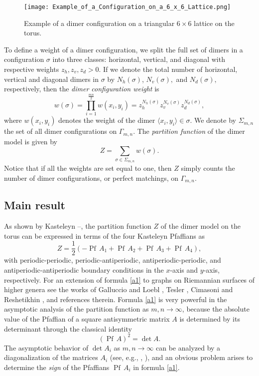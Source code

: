 \documentclass[12pt,reqno]{amsart}
\numberwithin{equation}{section}
\newcommand{\Ga}{\Gamma}
\newcommand{\sg}{\sigma}
\newcommand{\Pf}{{\operatorname{Pf}\,}}
\begin{document}
\begin{figure}[h!]
\texttt{[image: Example\_of\_a\_Configuration\_on\_a\_6\_x\_6\_Lattice.png]}
\caption{Example of a dimer configuration on a triangular $6\times 6$ lattice on the torus.}
\label{F8}
\end{figure}

To define a weight of a dimer configuration, we split the full set of dimers in a configuration $\sg$ into three classes: horizontal, vertical, and diagonal with respective weights $z_h, z_v, z_d>0.$ 
If we denote the total number of horizontal, vertical and diagonal dimers in $\sg$ by $N_h(\sg)$, $N_v(\sg),$ and $N_d(\sg),$ respectively, then the \textit{dimer configuration weight} is
\begin{equation}\label{int1}
w(\sg)=\prod_{i=1}^{\frac{mn}{2}}w(x_i,y_i)=z_h^{N_h(\sg)} z_v^{N_v(\sg)}z_d^{N_d(\sg)},
\end{equation}
where $w(x_i,y_i)$ denotes the weight of the dimer $\langle x_i,y_i\rangle\in\sg$.
We denote by $\Sigma_{m,n}$ the set of all dimer configurations on $\Ga_{m,n}$. 
The \textit{partition function} of the dimer model is given by
\begin{equation}\label{int2}
Z=\sum_{\sg\in\Sigma_{m,n}}w(\sg).
\end{equation}
Notice that if all the weights are set equal to one, then $Z$ simply counts the number of dimer configurations, or perfect matchings, on $\Gamma_{m,n}$. 

\subsection{Main result} As shown by Kasteleyn \cite{Kas1}--\cite{Kas3}, the partition function $Z$ of the dimer model on the torus can be expressed in terms of the
 four Kasteleyn Pfaffians as
\begin{equation}\label{a1}
Z=\frac{1}{2}\left(-\Pf A_{1} +\Pf A_{2} +\Pf A_{3} + \Pf A_{4}\right),
\end{equation}
with periodic-periodic, periodic-antiperiodic,  antiperiodic-periodic, and antiperiodic-antiperiodic boundary conditions
in the $x$-axis and $y$-axis, respectively. For an extension of formula \eqref{a1} to graphs on Riemannian surfaces of higher genera see  the works of Galluccio and Loebl \cite{GalluLoe}, Tesler \cite{Tes}, Cimasoni and Reshetikhin \cite{CimResh}, and references therein. Formula \eqref{a1} is very powerful in the asymptotic analysis of the partition function as $m,n\to\infty$, because the absolute value of the Pfaffian of a square antisymmetric matrix $A$ is determined by its determinant through the classical identity
\begin{equation}\label{a1a}
(\Pf A)^2=\det A.
\end{equation}
The asymptotic behavior of $\det A_i$ as $m,n\to\infty$ can be analyzed by a diagonalization of the matrices $A_i$ (see, e.g., \cite{Kas1}, \cite{Fend}), and
an obvious problem arises to determine the {\it sign} of the Pfaffians $\Pf A_i$
in formula \eqref{a1}. 
\end{document}
